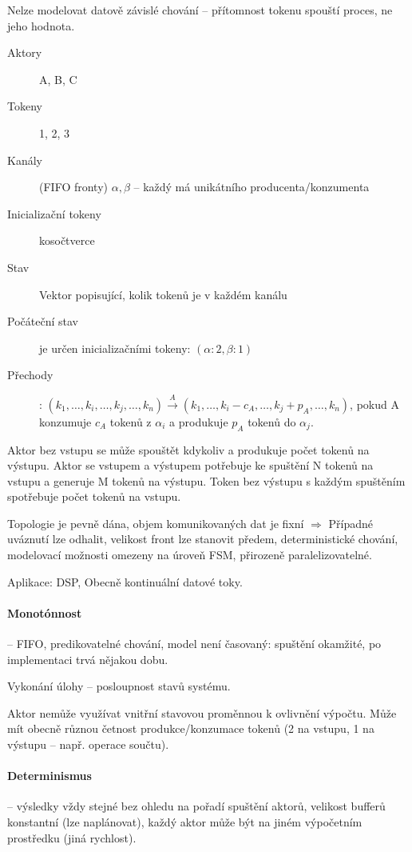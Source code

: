 \documentclass[a4paper, 11pt]{report}
\begin{document}
Nelze modelovat datově závislé chování -- přítomnost tokenu spouští proces, ne jeho hodnota.

\begin{description}
	\item[Aktory] A, B, C
	\item[Tokeny] 1, 2, 3
	\item[Kanály] (FIFO fronty) $\alpha, \beta$ -- každý má unikátního producenta/konzumenta
	\item[Inicializační tokeny] kosočtverce
	\item[Stav] Vektor popisující, kolik tokenů je v každém kanálu
	\item[Počáteční stav] je určen inicializačními tokeny: $(\alpha:2, \beta: 1)$
	\item[Přechody]: $(k_1, \dots, k_i, \dots, k_j, \dots, k_n) \xrightarrow{A}(k_1, \dots, k_i - c_A, \dots, k_j+p_A, \dots, k_n)$, pokud A konzumuje $c_A$ tokenů z $\alpha_i$ a produkuje $p_A$ tokenů do $\alpha_j$.
\end{description}

Aktor bez vstupu se může spouštět kdykoliv a produkuje počet tokenů na výstupu. Aktor se vstupem a výstupem potřebuje ke spuštění N tokenů na vstupu a generuje M tokenů na výstupu. Token bez výstupu s každým spuštěním spotřebuje počet tokenů na vstupu.

Topologie je pevně dána, objem komunikovaných dat je fixní $\Rightarrow$ Případné uváznutí lze odhalit, velikost front lze stanovit předem, deterministické chování, modelovací možnosti omezeny na úroveň FSM, přirozeně paralelizovatelné.

Aplikace: DSP, Obecně kontinuální datové toky.

\paragraph{Monotónnost} -- FIFO, predikovatelné chování, model není časovaný: spuštění okamžité, po implementaci trvá nějakou dobu.

Vykonání úlohy -- posloupnost stavů systému.

Aktor nemůže využívat vnitřní stavovou proměnnou k ovlivnění výpočtu. Může mít obecně různou četnost produkce/konzumace tokenů (2 na vstupu, 1 na výstupu -- např. operace součtu).

\paragraph{Determinismus} -- výsledky vždy stejné bez ohledu na pořadí spuštění aktorů, velikost bufferů konstantní (lze naplánovat), každý aktor může být na jiném výpočetním prostředku (jiná rychlost). 
\end{document}
